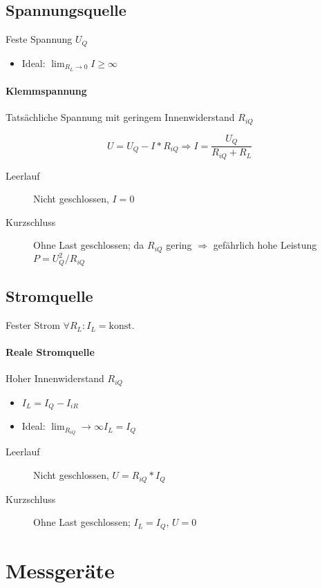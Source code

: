 \subsection{Spannungsquelle}

Feste Spannung $U_Q$

\begin{itemize}
  \item Ideal: $\lim_{R_L \rightarrow 0} I \geq \infty$
\end{itemize}

\paragraph{Klemmspannung} Tatsächliche Spannung mit geringem Innenwiderstand $R_{iQ}$

$$U = U_Q - I * R_{iQ} \Rightarrow I = \frac{U_Q}{R_{iQ} + R_L}$$

\begin{description}
  \item[Leerlauf] Nicht geschlossen, $I = 0$
  \item[Kurzschluss] Ohne Last geschlossen; da $R_{iQ}$ gering $\Rightarrow$ gefährlich hohe Leistung $P = U_Q^2 / R_{iQ}$
\end{description}

\subsection{Stromquelle}

Fester Strom $\forall R_L: I_L = \text{konst.}$

\paragraph{Reale Stromquelle} Hoher Innenwiderstand $R_{iQ}$

\begin{itemize}
  \item $I_L = I_Q - I_{iR}$
  \item Ideal: $\lim_{R_{iQ}} \rightarrow \infty I_L = I_Q$
\end{itemize}

\begin{description}
  \item[Leerlauf] Nicht geschlossen, $U = R_{iQ} * I_Q$
  \item[Kurzschluss] Ohne Last geschlossen; $I_L = I_Q$, $U = 0$
\end{description}

\section{Messgeräte}

